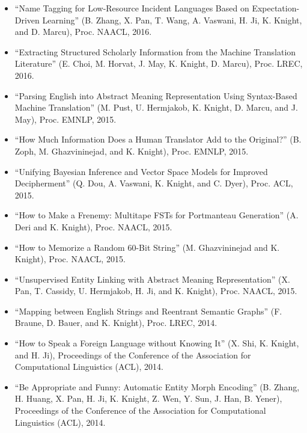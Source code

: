 \begin{itemize}
\item ``Name Tagging for Low-Resource Incident Languages Based on Expectation-Driven Learning'' (B. Zhang, X. Pan, T. Wang, A. Vaswani, H. Ji, K. Knight, and D. Marcu), Proc. NAACL, 2016. 

\item ``Extracting Structured Scholarly Information from the Machine Translation Literature'' (E. Choi, M. Horvat, J. May, K. Knight, D. Marcu), Proc. LREC, 2016. 

\item ``Parsing English into Abstract Meaning Representation Using
Syntax-Based Machine Translation''
(M. Pust, U. Hermjakob, K. Knight, D. Marcu, and J. May), Proc. EMNLP, 2015.

\item ``How Much Information Does a Human Translator Add to the Original?''
(B. Zoph, M. Ghazvininejad, and K. Knight), Proc. EMNLP, 2015.

\item ``Unifying Bayesian Inference and Vector Space Models for Improved Decipherment'' (Q. Dou, A. Vaswani, K. Knight, and C. Dyer), Proc. ACL, 2015.

\item ``How to Make a Frenemy: Multitape FSTs for Portmanteau Generation''
(A. Deri and K. Knight), Proc. NAACL, 2015.

\item ``How to Memorize a Random 60-Bit String''
(M. Ghazvininejad and K. Knight), Proc. NAACL, 2015.

\item ``Unsupervised Entity Linking with Abstract Meaning Representation''
(X. Pan, T. Cassidy, U. Hermjakob, H. Ji, and K. Knight), Proc. NAACL, 2015.

\item ``Mapping between English Strings and Reentrant Semantic Graphs'' (F. Braune, D. Bauer, and K. Knight), Proc. LREC, 2014. 

\item ``How to Speak a Foreign Language without Knowing It'' (X. Shi, K. Knight, and H. Ji), 
Proceedings of the Conference of the 
Association for Computational Linguistics (ACL), 2014.

\item ``Be Appropriate and Funny: Automatic Entity Morph Encoding'' (B. Zhang, H. Huang, X. Pan, H. Ji, K. Knight, Z. Wen, Y. Sun, J. Han, B. Yener), 
Proceedings of the Conference of the 
Association for Computational Linguistics (ACL), 2014.


\end{itemize}
